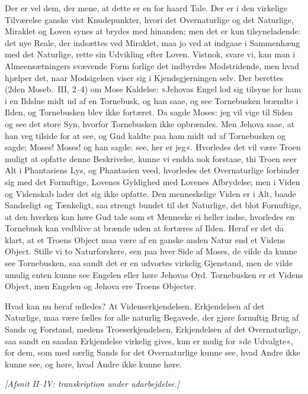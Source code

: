 \documentclass[12pt,a4paper]{article}
\begin{document}
Der er vel dem, der mene, at dette er en for haard Tale. Der er i den
virkelige Tilværelse ganske vist Knudepunkter, hvori det Overnaturlige
og det Naturlige, Miraklet og Loven synes at brydes med hinanden; men
det er kun tilsyneladende: det nye Reale, der indsættes ved Miraklet,
maa jo ved at indgaae i Sammenhæng med det Naturlige, rette sin
Udvikling efter Loven. Vistnok, svare vi, kan man i Almeensætningers
svævende Form forlige det indbyrdes Modstridende, men hvad hjælper det,
naar Modsigelsen viser sig i Kjendsgjerningen selv. Der berettes (2den
Moseb.\ III, 2--4) om Mose Kaldelse: »Jehovas Engel lod sig tilsyne
for ham i en Ildslue midt ud af en Tornebusk, og han saae, og see
Tornebusken brændte i Ilden, og Tornebusken blev ikke fortæret. Da
sagde Moses: jeg vil vige til Siden og see det store Syn, hvorfor
Tornebusken ikke opbrændes. Men Jehova saae, at han veg tilside for at
see, og Gud kaldte paa ham midt ud af Tornebusken og sagde: Moses!
Moses! og han sagde: see, her er jeg«. Hvorledes det vil være Troen
muligt at opfatte denne Beskrivelse, kunne vi endda nok forstaae, thi
Troen seer Alt i Phantasiens Lys, og Phantasien veed, hvorledes det
Overnaturlige forbinder sig med det Fornuftige, Lovenes Gyldighed med
Lovenes Afbrydelse; men i Viden og Videnskab lader det sig ikke
opfatte. Den menneskelige Viden er i Alt, baade Sandseligt og
Tænkeligt, saa strengt bundet til det Naturlige, det blot Fornuftige,
at den hverken kan høre Gud tale som et Menneske ei heller indse,
hvorledes en Tornebusk kan vedblive at brænde uden at fortæres af
Ilden. Heraf er det da klart, at et Troens Object maa være af en ganske
anden Natur end et Videns Object. Stille vi to Naturforskere, een paa
hver Side af Moses, de vilde da kunne see Tornebusken, saa sandt det er
en udvortes virkelig Gjenstand, men de vilde umulig enten kunne see
Engelen eller høre Jehovas Ord. Tornebusken er et Videns Object, men
Engelen og Jehova ere Troens Objecter.

Hvad kan nu heraf udledes? At Videnserkjendelsen, Erkjendelsen af det
Naturlige, maa være fælles for alle naturlig Begavede, der gjøre
fornuftig Brug af Sands og Forstand, medens Troeserkjendelsen,
Erkjendelsen af det Overnaturlige, saa sandt en saadan Erkjendelse
virkelig gives, kun er mulig for »de Udvalgte«, for dem, som med særlig
Sands for det Overnaturlige kunne see, hvad Andre ikke kunne see, og
høre, hvad Andre ikke kunne høre.


\bigskip
\noindent\textit{[Afsnit II--IV: transkription under udarbejdelse.]}
\end{document}
